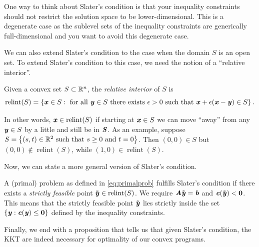 One way to think about Slater's condition is that your inequality
constraints should not restrict the solution space to be
lower-dimensional. This is a degenerate case as the sublevel sets of
the inequality constraints are generically full-dimensional and you
want to avoid this degenerate case.

We can also extend Slater's condition to the case when the domain $S$
is an open set.
To extend Slater's condition to this case, we need the notion of a ``relative interior''.


\begin{definition} \label{def:relint}
  Given a convex set $S \subset \mathbb{R}^n$, the \emph{relative interior} of $S$ is
  \[
    \operatorname{relint}(S) = \left\{\boldsymbol{\mathit{x}} \in S : \text{ for all } \boldsymbol{\mathit{y}}
      \in S \text{ there exists } \epsilon > 0 \text{ such that }
      \boldsymbol{\mathit{x}} + \epsilon(\boldsymbol{\mathit{x}} - \boldsymbol{\mathit{y}}) \in S \right\}
    .
  \]
\end{definition}
In other words, $\boldsymbol{\mathit{x}} \in \operatorname{relint}(S)$ if starting at $\boldsymbol{\mathit{x}}
\in S$ we can move
``away'' from any $\boldsymbol{\mathit{y}} \in S$ by a little and still be in $\boldsymbol{\mathit{S}}$.
As an example, suppose $S = \left\{(s,t) \in \mathbb{R}^2 \text{ such that } s
  \geq 0 \text{ and } t = 0 \right\}$.
Then $(0,0) \in S$ but $(0,0) \not\in \operatorname{relint}(S)$, while
$(1,0) \in \operatorname{relint}(S)$.

Now, we can state a more general version of Slater's condition.

\begin{definition} \label{def:slatergeneral}
A (primal) problem as defined in \eqref{eq:primalprob} fulfills
Slater's condition if there exists a \emph{strictly feasible} point
$\boldsymbol{\tilde{\mathit{y}}} \in \operatorname{relint}(S)$.
We require $\boldsymbol{\mathit{A}}\boldsymbol{\tilde{\mathit{y}}} = \boldsymbol{\mathit{b}}$ and $\boldsymbol{\mathit{c}}(\boldsymbol{\tilde{\mathit{y}}}) <
\boldsymbol{0}$.
This means that the strictly feasible point $\boldsymbol{\tilde{\mathit{y}}}$ lies strictly inside the set $\{\boldsymbol{\mathit{y}} : \boldsymbol{\mathit{c}}(\boldsymbol{\mathit{y}}) \leq \boldsymbol{0}\}$ defined by the inequality constraints.
\end{definition}

Finally, we end with a proposition that tells us that given Slater's
condition, the KKT are indeed necessary for optimality of our convex programs.

